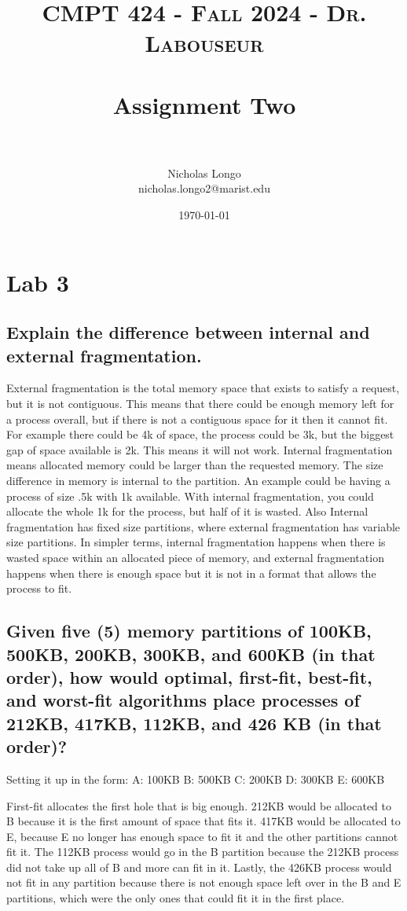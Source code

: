 \documentclass[letterpaper, 10pt,DIV=13]{scrartcl}
\title{	
   \normalfont \normalsize 
   \textsc{CMPT 424 - Fall 2024 - Dr. Labouseur} \\[10pt] %
   \horrule{0.5pt} \\[0.25cm] 	%
   \huge Assignment Two  \\     	    %
   \horrule{0.5pt} \\[0.25cm] 	%
}
\author{Nicholas Longo \\ \normalsize nicholas.longo2@marist.edu}
\date{\normalsize\today} 	%
\numberwithin{equation}{section} %
\numberwithin{figure}{section} %
\numberwithin{table}{section} %
\begin{document}
\maketitle %

\section{Lab 3}

\subsection{Explain the difference between internal and external fragmentation. }
External fragmentation is the total memory space that exists to satisfy a request, but it is not contiguous. This means that there could be enough memory left for a process overall, but if there is not a contiguous space for it then it cannot fit. For example there could be 4k of space, the process could be 3k, but the biggest gap of space available is 2k. This means it will not work. Internal fragmentation means allocated memory could be larger than the requested memory. The size difference in memory is internal to the partition. An example could be having a process of size .5k with 1k available. With internal fragmentation, you could allocate the whole 1k for the process, but half of it is wasted. Also Internal fragmentation has fixed size partitions, where external fragmentation has variable size partitions. In simpler terms, internal fragmentation happens when there is wasted space within an allocated piece of memory, and external fragmentation happens when there is enough space but it is not in a format that allows the process to fit. 



\subsection{Given five (5) memory partitions of 100KB, 500KB, 200KB, 300KB, and	600KB	(in that	 order),	how would optimal, first-fit, best-fit, and worst-fit algorithms	place processes of 212KB, 417KB, 112KB,  and 426 KB (in that order)? 
}
Setting it up in the form: 
	A: 100KB
	B: 500KB
	C: 200KB
	D: 300KB
	E: 600KB

First-fit allocates the first hole that is big enough. 
	212KB would be allocated to B because it is the first amount of space that fits it. 417KB would be allocated to E, because E no longer has enough space to fit it and the other partitions cannot fit it. The 112KB process would go in the B partition because the 212KB process did not take up all of B and more can fit in it. Lastly, the 426KB process would not fit in any partition because there is not enough space left over in the B and E partitions, which were the only ones that could fit it in the first place. 
\end{document}
